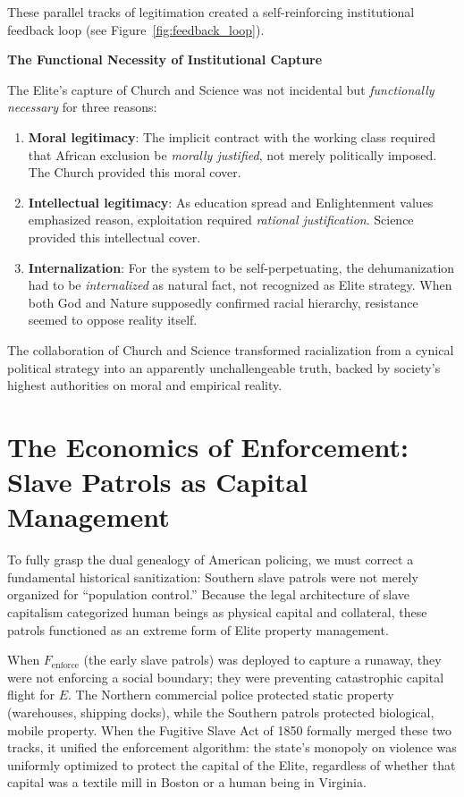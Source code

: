 \documentclass[12pt,openany]{book}
\begin{document}
These parallel tracks of legitimation created a self-reinforcing institutional feedback loop (see Figure~\ref{fig:feedback_loop}).

\textbf{The Functional Necessity of Institutional Capture}

The Elite's capture of Church and Science was not incidental but \textit{functionally necessary} for three reasons:

\begin{enumerate}
    \item \textbf{Moral legitimacy}: The implicit contract with the working class required that African exclusion be \textit{morally justified}, not merely politically imposed. The Church provided this moral cover.
    
    \item \textbf{Intellectual legitimacy}: As education spread and Enlightenment values emphasized reason, exploitation required \textit{rational justification}. Science provided this intellectual cover.
    
    \item \textbf{Internalization}: For the system to be self-perpetuating, the dehumanization had to be \textit{internalized} as natural fact, not recognized as Elite strategy. When both God and Nature supposedly confirmed racial hierarchy, resistance seemed to oppose reality itself.
\end{enumerate}

The collaboration of Church and Science transformed racialization from a cynical political strategy into an apparently unchallengeable truth, backed by society's highest authorities on moral and empirical reality.

\section{The Economics of Enforcement: Slave Patrols as Capital Management}

To fully grasp the dual genealogy of American policing, we must correct a fundamental historical sanitization: Southern slave patrols were not merely organized for ``population control.'' Because the legal architecture of slave capitalism categorized human beings as physical capital and collateral, these patrols functioned as an extreme form of Elite property management.

When $F_{\text{enforce}}$ (the early slave patrols) was deployed to capture a runaway, they were not enforcing a social boundary; they were preventing catastrophic capital flight for $E$. The Northern commercial police protected static property (warehouses, shipping docks), while the Southern patrols protected biological, mobile property. When the Fugitive Slave Act of 1850 formally merged these two tracks, it unified the enforcement algorithm: the state's monopoly on violence was uniformly optimized to protect the capital of the Elite, regardless of whether that capital was a textile mill in Boston or a human being in Virginia.
\end{document}
